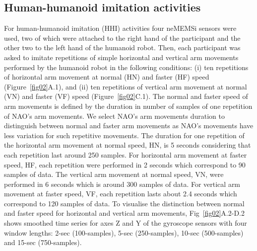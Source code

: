 \documentclass[fleqn,10pt]{wlscirep}
\begin{document}
\subsection*{Human-humanoid imitation activities}
For human-humanoid imitation (HHI) activities four neMEMSi sensors were used,
two of which were attached to the right hand of the participant and the 
other two to the left hand of the humanoid robot.
Then, each participant was asked to imitate repetitions of simple horizontal
and vertical arm movements performed by the humanoid robot in the following 
conditions:
(i) ten repetitions of horizontal arm movement at normal (HN) 
	and faster (HF) speed (Figure~\ref{fig02}A.1), and
(ii) ten repetitions of vertical arm movement at normal (VN) 
	and faster (VF) speed (Figure~\ref{fig02}C.1).
The normal and faster speed of arm movements is defined by the duration 
in number of samples of one repetition of NAO's arm movements. 
We select NAO's arm movements duration to distinguish between normal and 
faster arm movements as NAO's movements have less variation 
for such repetitive movements. 
The duration for one repetition of the horizontal 
arm movement at normal speed, HN, is 5 seconds considering 
that each repetition last around 250 samples.
For horizontal arm movement at faster speed, HF, each repetition were performed 
in 2 seconds which correspond to 90 samples of data.
The vertical arm movement at normal speed, VN, were performed  in 6 seconds 
which is around 300 samples of data. For vertical arm movement at 
faster speed, VF, each repetition lasts about 2.4 seconds which correspond 
to 120 samples of data.
To visualise the distinction between normal and faster speed for horizontal 
and vertical arm movements, Fig~\ref{fig02}A.2-D.2 shows smoothed time series
for axes Z and Y of the gyroscope sensors with four window lengths: 
2-sec (100-samples), 5-sec (250-samples), 10-sec (500-samples) 
and 15-sec (750-samples).
\end{document}
